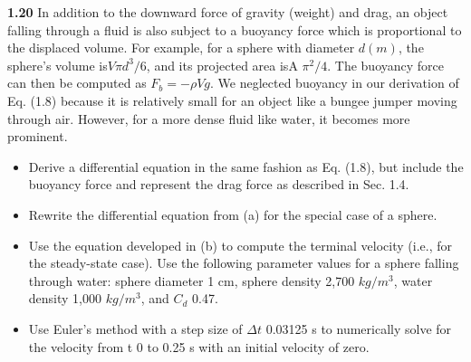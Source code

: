 \documentclass[../main.tex]{subfiles}
\begin{document}
\begin{multicols}{2}
\textbf{1.20} In addition to the downward force of gravity (weight)
and drag, an object falling through a fluid is also subject to a
buoyancy force which is proportional to the displaced volume. For example, for a sphere with diameter $d (m)$, the
sphere's volume is$ V  \pi  d^3/6$, and its projected area isA  $\pi ^2/4$. The buoyancy force can then be computed as
$F_b= -\rho Vg$. We neglected buoyancy in our derivation of
Eq. (1.8) because it is relatively small for an object like a
bungee jumper moving through air. However, for a more
dense fluid like water, it becomes more prominent.
\begin{itemize}
	\item Derive a differential equation in the same fashion as
	Eq. (1.8), but include the buoyancy force and represent
	the drag force as described in Sec. 1.4.
	\item Rewrite the differential equation from (a) for the special
	case of a sphere.
	\item Use the equation developed in (b) to compute the terminal
	velocity (i.e., for the steady-state case). Use the following
	parameter values for a sphere falling through water:
	sphere diameter  1 cm, sphere density  2,700 $kg/m^3$,
	water density  1,000 $kg/m^3$, and $C_d$  0.47.
	\item Use Euler's method with a step size of $\Delta t $ 0.03125 s to
	numerically solve for the velocity from t  0 to 0.25 s
	with an initial velocity of zero. 
	
\end{itemize}

\end{multicols}
\end{document}
